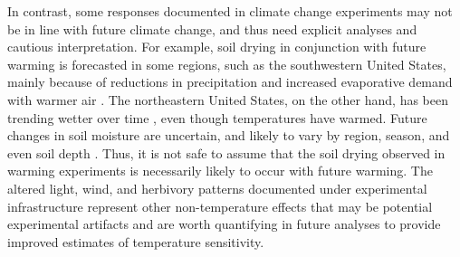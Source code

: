 \documentclass{article}
\begin{document}
\par In contrast, some responses documented in climate change experiments may not be in line with future climate change, and thus need explicit analyses and cautious interpretation.
For example, soil drying in conjunction with future warming is forecasted in some regions, such as the southwestern United States, mainly because of reductions in precipitation and increased evaporative demand with warmer air \citep{dai2013,seager2013}. The northeastern United States, on the other hand, has been trending wetter over time \citep{shuman2017}, even though temperatures have warmed. Future changes in soil moisture are uncertain, and likely to vary by region, season, and even soil depth \citep{seager2014,berg2017}. Thus, it is not safe to assume that the soil drying observed in warming experiments is necessarily likely to occur with future warming. The altered light, wind, and herbivory patterns documented under experimental infrastructure \citep{kennedy1995,moise2010,wolkovich2012,hoeppner2012, clark2014b} represent other non-temperature effects that may be potential experimental artifacts and are worth quantifying in future analyses to provide improved estimates of temperature sensitivity.
\end{document}
